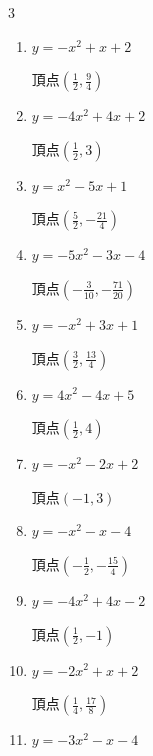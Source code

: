 \begin{multicols}{3}
\begin{enumerate}
        $\displaystyle 頂点\left( \frac{5}{2} , \frac{37}{4} \right)$

  \item $\displaystyle y=-x^{2}+x+2$

        $\displaystyle 頂点\left( \frac{1}{2} , \frac{9}{4} \right)$

  \item $\displaystyle y=-4x^{2}+4x+2$

        $\displaystyle 頂点\left( \frac{1}{2} , 3 \right)$

  \item $\displaystyle y=x^{2}-5x+1$

        $\displaystyle 頂点\left( \frac{5}{2} , -\frac{21}{4} \right)$

  \item $\displaystyle y=-5x^{2}-3x-4$

        $\displaystyle 頂点\left( -\frac{3}{10} , -\frac{71}{20} \right)$

\columnbreak %

  \item $\displaystyle y=-x^{2}+3x+1$

        $\displaystyle 頂点\left( \frac{3}{2} , \frac{13}{4} \right)$

  \item $\displaystyle y=4x^{2}-4x+5$

        $\displaystyle 頂点\left( \frac{1}{2} , 4 \right)$

  \item $\displaystyle y=-x^{2}-2x+2$

        $\displaystyle 頂点\left( -1 , 3 \right)$

  \item $\displaystyle y=-x^{2}-x-4$

        $\displaystyle 頂点\left( -\frac{1}{2} , -\frac{15}{4} \right)$

  \item $\displaystyle y=-4x^{2}+4x-2$

        $\displaystyle 頂点\left( \frac{1}{2} , -1 \right)$

\columnbreak %

\resetques

  \item $\displaystyle y=-2x^{2}+x+2$

        $\displaystyle 頂点\left( \frac{1}{4} , \frac{17}{8} \right)$

  \item $\displaystyle y=-3x^{2}-x-4$


\end{enumerate}
\end{multicols}
